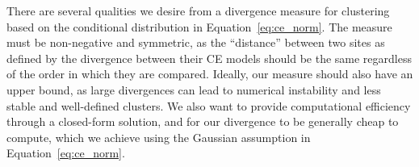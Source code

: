 \documentclass[
  12pt]{article}
\begin{document}
There are several qualities we desire from a divergence measure for clustering based on the conditional distribution in Equation~\eqref{eq:ce_norm}.
The measure must be non-negative and symmetric, as the ``distance'' between two sites as defined by the divergence between their CE models should be the same regardless of the order in which they are compared.
Ideally, our measure should also have an upper bound, as large divergences can lead to numerical instability and less stable and well-defined clusters.
We also want to provide computational efficiency through a closed-form solution, and for our divergence to be generally cheap to compute, which we achieve using the Gaussian assumption in Equation~\eqref{eq:ce_norm}.
\end{document}
